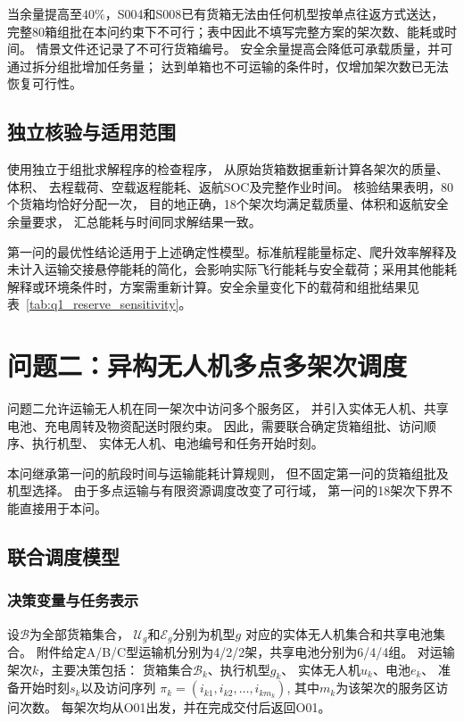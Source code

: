 \documentclass[bwprint]{gmcmthesis}
\begin{document}
当余量提高至$40\%$，S004和S008已有货箱无法由任何机型按单点往返方式送达，
完整80箱组批在本问约束下不可行；表中因此不填写完整方案的架次数、能耗或时间。
情景文件还记录了不可行货箱编号。
安全余量提高会降低可承载质量，并可通过拆分组批增加任务量；
达到单箱也不可运输的条件时，仅增加架次数已无法恢复可行性。

\subsection{独立核验与适用范围}

使用独立于组批求解程序的检查程序，
从原始货箱数据重新计算各架次的质量、体积、
去程载荷、空载返程能耗、返航SOC及完整作业时间。
核验结果表明，80个货箱均恰好分配一次，
目的地正确，18个架次均满足载质量、体积和返航安全余量要求，
汇总能耗与时间同求解结果一致。

第一问的最优性结论适用于上述确定性模型。标准航程能量标定、爬升效率解释及未计入运输交接悬停能耗的简化，会影响实际飞行能耗与安全载荷；采用其他能耗解释或环境条件时，方案需重新计算。安全余量变化下的载荷和组批结果见表~\ref{tab:q1_reserve_sensitivity}。


\section{问题二：异构无人机多点多架次调度}

问题二允许运输无人机在同一架次中访问多个服务区，
并引入实体无人机、共享电池、充电周转及物资配送时限约束。
因此，需要联合确定货箱组批、访问顺序、执行机型、
实体无人机、电池编号和任务开始时刻。

本问继承第一问的航段时间与运输能耗计算规则，
但不固定第一问的货箱组批及机型选择。
由于多点运输与有限资源调度改变了可行域，
第一问的18架次下界不能直接用于本问。

\subsection{联合调度模型}

\subsubsection{决策变量与任务表示}

设$\mathcal{B}$为全部货箱集合，
$\mathcal{U}_g$和$\mathcal{E}_g$分别为机型$g$
对应的实体无人机集合和共享电池集合。
附件给定A/B/C型运输机分别为4/2/2架，共享电池分别为6/4/4组。
对运输架次$k$，主要决策包括：
货箱集合$\mathcal{B}_k$、执行机型$g_k$、
实体无人机$u_k$、电池$e_k$、
准备开始时刻$s_k$以及访问序列
\(\pi_k=(i_{k1},i_{k2},\ldots,i_{km_k})\),
其中$m_k$为该架次的服务区访问次数。
每架次均从O01出发，并在完成交付后返回O01。
\end{document}
